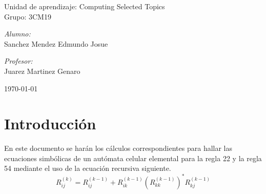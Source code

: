 \documentclass[11pt]{article}
\begin{document}
\begin{titlepage}
\begin{center}
				{ \Large Unidad de aprendizaje: Computing Selected Topics} \\[1cm]
				
				{ \Large Grupo: 3CM19 } \\[1cm]
				
				\noindent
				\begin{minipage}{0.5\textwidth}
					\begin{flushleft} \large
						\emph{Alumno:} \\
						Sanchez Mendez Edmundo Josue
					\end{flushleft}
				\end{minipage}%
				\begin{minipage}{0.5\textwidth}
					\begin{flushright} \large
						\emph{Profesor:} \\
						Juarez Martinez Genaro
					\end{flushright}
				\end{minipage}
				
				\vfill
				{\large {\today}}
			\end{center}
		\end{titlepage}
	
	\titlepage
	\tableofcontents
	\newpage
	
	\section{Introducción}
		En este documento se harán los cálculos correspondientes para hallar las ecuaciones simbólicas de un autómata celular elemental para la regla 22 y la regla 54 mediante el uso de la ecuación recursiva siguiente.
	\begin{equation}
		R_{ij}^{(k)}=R_{ij}^{(k-1)}+R_{ik}^{(k-1)}{(R_{kk}^{(k-1)})}^\ast R_{kj}^{(k-1)}
	\end{equation}
\end{document}
